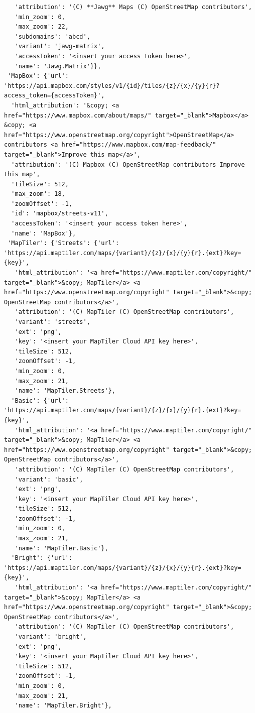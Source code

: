 \documentclass[
  letterpaper,
  DIV=11,
  numbers=noendperiod]{scrreprt}
\begin{document}
\begin{verbatim}
   'attribution': '(C) **Jawg** Maps (C) OpenStreetMap contributors',
   'min_zoom': 0,
   'max_zoom': 22,
   'subdomains': 'abcd',
   'variant': 'jawg-matrix',
   'accessToken': '<insert your access token here>',
   'name': 'Jawg.Matrix'}},
 'MapBox': {'url': 'https://api.mapbox.com/styles/v1/{id}/tiles/{z}/{x}/{y}{r}?access_token={accessToken}',
  'html_attribution': '&copy; <a href="https://www.mapbox.com/about/maps/" target="_blank">Mapbox</a> &copy; <a href="https://www.openstreetmap.org/copyright">OpenStreetMap</a> contributors <a href="https://www.mapbox.com/map-feedback/" target="_blank">Improve this map</a>',
  'attribution': '(C) Mapbox (C) OpenStreetMap contributors Improve this map',
  'tileSize': 512,
  'max_zoom': 18,
  'zoomOffset': -1,
  'id': 'mapbox/streets-v11',
  'accessToken': '<insert your access token here>',
  'name': 'MapBox'},
 'MapTiler': {'Streets': {'url': 'https://api.maptiler.com/maps/{variant}/{z}/{x}/{y}{r}.{ext}?key={key}',
   'html_attribution': '<a href="https://www.maptiler.com/copyright/" target="_blank">&copy; MapTiler</a> <a href="https://www.openstreetmap.org/copyright" target="_blank">&copy; OpenStreetMap contributors</a>',
   'attribution': '(C) MapTiler (C) OpenStreetMap contributors',
   'variant': 'streets',
   'ext': 'png',
   'key': '<insert your MapTiler Cloud API key here>',
   'tileSize': 512,
   'zoomOffset': -1,
   'min_zoom': 0,
   'max_zoom': 21,
   'name': 'MapTiler.Streets'},
  'Basic': {'url': 'https://api.maptiler.com/maps/{variant}/{z}/{x}/{y}{r}.{ext}?key={key}',
   'html_attribution': '<a href="https://www.maptiler.com/copyright/" target="_blank">&copy; MapTiler</a> <a href="https://www.openstreetmap.org/copyright" target="_blank">&copy; OpenStreetMap contributors</a>',
   'attribution': '(C) MapTiler (C) OpenStreetMap contributors',
   'variant': 'basic',
   'ext': 'png',
   'key': '<insert your MapTiler Cloud API key here>',
   'tileSize': 512,
   'zoomOffset': -1,
   'min_zoom': 0,
   'max_zoom': 21,
   'name': 'MapTiler.Basic'},
  'Bright': {'url': 'https://api.maptiler.com/maps/{variant}/{z}/{x}/{y}{r}.{ext}?key={key}',
   'html_attribution': '<a href="https://www.maptiler.com/copyright/" target="_blank">&copy; MapTiler</a> <a href="https://www.openstreetmap.org/copyright" target="_blank">&copy; OpenStreetMap contributors</a>',
   'attribution': '(C) MapTiler (C) OpenStreetMap contributors',
   'variant': 'bright',
   'ext': 'png',
   'key': '<insert your MapTiler Cloud API key here>',
   'tileSize': 512,
   'zoomOffset': -1,
   'min_zoom': 0,
   'max_zoom': 21,
   'name': 'MapTiler.Bright'},

\end{verbatim}
\end{document}
